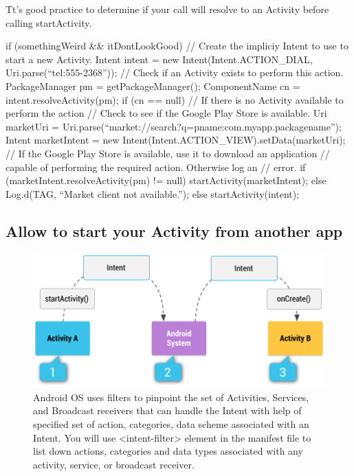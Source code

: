 \begin{framed}
Tt’s good practice to determine if your call will resolve to an Activity before calling startActivity.
\end{framed}

\begin{android}
if (somethingWeird && itDontLookGood) {
	// Create the impliciy Intent to use to start a new Activity.
	Intent intent =
	new Intent(Intent.ACTION_DIAL, Uri.parse(“tel:555-2368”));
	// Check if an Activity exists to perform this action.
	PackageManager pm = getPackageManager();
	ComponentName cn = intent.resolveActivity(pm);
	if (cn == null) {
		// If there is no Activity available to perform the action
		// Check to see if the Google Play Store is available.
		Uri marketUri =
		Uri.parse(“market://search?q=pname:com.myapp.packagename”);
		Intent marketIntent = new Intent(Intent.ACTION_VIEW).setData(marketUri);
		// If the Google Play Store is available, use it to download an application
		// capable of performing the required action. Otherwise log an
		// error.
		if (marketIntent.resolveActivity(pm) != null){
			startActivity(marketIntent);
		}
		else{
			Log.d(TAG, “Market client not available.”);
		}
	}
	else {
		startActivity(intent);
	}
}
\end{android}

\subsection{Allow to start your Activity from another app}

\begin{figure}
	\includegraphics[width=\textwidth]{images/intents/intentresolution.png}
	\caption{Android OS uses filters to pinpoint the set of Activities, Services, and Broadcast receivers that can handle the Intent with help of specified set of action, categories, data scheme associated with an Intent. You will use <intent-filter> element in the manifest file to list down actions, categories and data types associated with any activity, service, or broadcast receiver.}
	\label{fig:intentresolution}
\end{figure}

